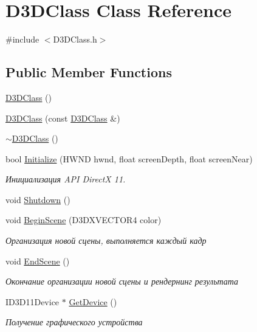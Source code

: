 \hypertarget{class_d3_d_class}{}\section{D3\+D\+Class Class Reference}
\label{class_d3_d_class}


{\ttfamily \#include $<$D3\+D\+Class.\+h$>$}

\subsection*{Public Member Functions}
\begin{DoxyCompactItemize}
\item 
\hyperlink{class_d3_d_class_a889771d09ad54486caf56bc64e156aa6}{D3\+D\+Class} ()
\item 
\hyperlink{class_d3_d_class_a83a37634c4176706232667b44e62d89a}{D3\+D\+Class} (const \hyperlink{class_d3_d_class}{D3\+D\+Class} \&)
\item 
\hyperlink{class_d3_d_class_ab9bcaec0019ff9319e3aec1df3180032}{$\sim$\+D3\+D\+Class} ()
\item 
bool \hyperlink{class_d3_d_class_a0c37e1e0345ddea3020dfd4bf55e1ded}{Initialize} (H\+W\+ND hwnd, float screen\+Depth, float screen\+Near)
\begin{DoxyCompactList}\small\item\em Инициализация A\+PI DirectX 11. \end{DoxyCompactList}\item 
void \hyperlink{class_d3_d_class_a0765f6da66273e11c005d571d8dfbcb6}{Shutdown} ()
\item 
void \hyperlink{class_d3_d_class_ae045b2d0d3fee31671a643ce0e0bb307}{Begin\+Scene} (D3\+D\+X\+V\+E\+C\+T\+O\+R4 color)
\begin{DoxyCompactList}\small\item\em Организация новой сцены, выполняется каждый кадр \end{DoxyCompactList}\item 
void \hyperlink{class_d3_d_class_a53240832687367286a27b31c5f47e63d}{End\+Scene} ()
\begin{DoxyCompactList}\small\item\em Окончание организации новой сцены и рендернинг результата \end{DoxyCompactList}\item 
I\+D3\+D11\+Device $\ast$ \hyperlink{class_d3_d_class_a20963c561731ea05018ec626d1fba80c}{Get\+Device} ()
\begin{DoxyCompactList}\small\item\em Получение графического устройства \end{DoxyCompactList}\item 

\end{DoxyCompactItemize}
